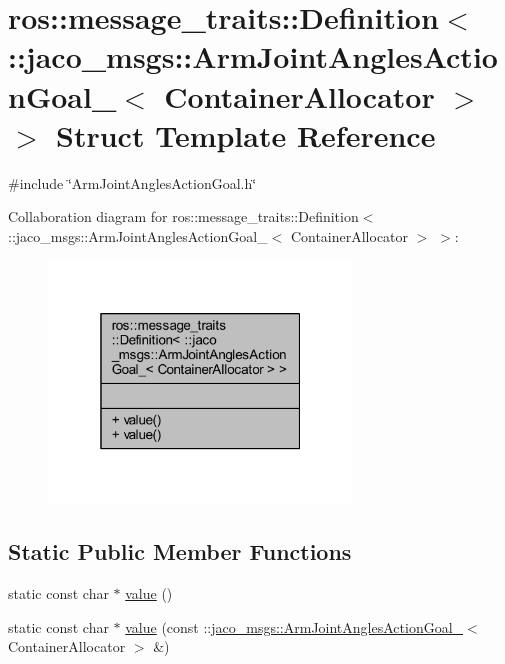 \hypertarget{structros_1_1message__traits_1_1Definition_3_01_1_1jaco__msgs_1_1ArmJointAnglesActionGoal___3_01ContainerAllocator_01_4_01_4}{}\section{ros\+:\+:message\+\_\+traits\+:\+:Definition$<$ \+:\+:jaco\+\_\+msgs\+:\+:Arm\+Joint\+Angles\+Action\+Goal\+\_\+$<$ Container\+Allocator $>$ $>$ Struct Template Reference}
\label{structros_1_1message__traits_1_1Definition_3_01_1_1jaco__msgs_1_1ArmJointAnglesActionGoal___3_01ContainerAllocator_01_4_01_4}


{\ttfamily \#include \char`\"{}Arm\+Joint\+Angles\+Action\+Goal.\+h\char`\"{}}



Collaboration diagram for ros\+:\+:message\+\_\+traits\+:\+:Definition$<$ \+:\+:jaco\+\_\+msgs\+:\+:Arm\+Joint\+Angles\+Action\+Goal\+\_\+$<$ Container\+Allocator $>$ $>$\+:
\nopagebreak
\begin{figure}[H]
\begin{center}
\leavevmode
\includegraphics[width=229pt]{d7/d3f/structros_1_1message__traits_1_1Definition_3_01_1_1jaco__msgs_1_1ArmJointAnglesActionGoal___3_01f92d6aa9fa7db790bd2418dc167697a7}
\end{center}
\end{figure}
\subsection*{Static Public Member Functions}
\begin{DoxyCompactItemize}
\item 
static const char $\ast$ \hyperlink{structros_1_1message__traits_1_1Definition_3_01_1_1jaco__msgs_1_1ArmJointAnglesActionGoal___3_01ContainerAllocator_01_4_01_4_a8fd0eccceccc9655074671c8fe700afc}{value} ()
\item 
static const char $\ast$ \hyperlink{structros_1_1message__traits_1_1Definition_3_01_1_1jaco__msgs_1_1ArmJointAnglesActionGoal___3_01ContainerAllocator_01_4_01_4_a146e3445dd1583bf97b848d5a22b64c9}{value} (const \+::\hyperlink{structjaco__msgs_1_1ArmJointAnglesActionGoal__}{jaco\+\_\+msgs\+::\+Arm\+Joint\+Angles\+Action\+Goal\+\_\+}$<$ Container\+Allocator $>$ \&)
\end{DoxyCompactItemize}



